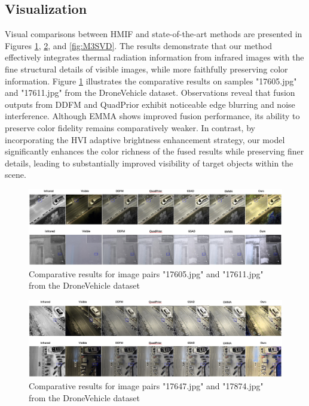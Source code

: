 \documentclass[journal]{IEEEtran}
\begin{document}
\subsection{Visualization}
Visual comparisons between HMIF and state-of-the-art methods are presented in Figures \ref{fig:DroneVehical1}, \ref{fig:DroneVehical2}, and \ref{fig:M3SVD}. The results demonstrate that our method effectively integrates thermal radiation information from infrared images with the fine structural details of visible images, while more faithfully preserving color information. Figure \ref{fig:DroneVehical1} illustrates the comparative results on samples "17605.jpg" and "17611.jpg" from the DroneVehicle dataset. Observations reveal that fusion outputs from DDFM and QuadPrior exhibit noticeable edge blurring and noise interference. Although EMMA shows improved fusion performance, its ability to preserve color fidelity remains comparatively weaker. In contrast, by incorporating the HVI adaptive brightness enhancement strategy, our model significantly enhances the color richness of the fused results while preserving finer details, leading to substantially improved visibility of target objects within the scene.
\begin{figure}[!t]
    \centering
    \includegraphics[width=1.0\textwidth]{chapter and images/Drone1.png}
    \caption{Comparative results for image pairs "17605.jpg" and "17611.jpg" from the DroneVehicle dataset}
    \label{fig:DroneVehical1}
\end{figure}

\begin{figure}[!t]
    \centering
    \includegraphics[width=1.0\textwidth]{chapter and images/Drone2.png}
    \caption{Comparative results for image pairs "17647.jpg" and "17874.jpg" from the DroneVehicle dataset}
    \label{fig:DroneVehical2}
\end{figure}
\end{document}
